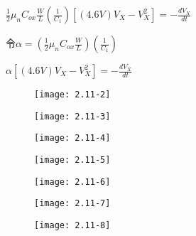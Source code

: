 $\frac{1}{2}\mu_nC_{ox}\frac{W}{L}(\frac{1}{C_1})[(4.6V)V_{X}-V_{X}^2]=-\frac{dV_X}{dt}$

令$\alpha=(\frac{1}{2}\mu_nC_{ox}\frac{W}{L})(\frac{1}{C_1})$

$\alpha[(4.6V)V_{X}-V_{X}^2]=-\frac{dV_X}{dt}$

	\begin{figure}[H] %
	\begin{minipage}{\linewidth}
		\texttt{[image: 2.11-2]}
	\end{minipage}
\end{figure}

	\begin{figure}[H] %
	\begin{minipage}{\linewidth}
		\texttt{[image: 2.11-3]}
	\end{minipage}
\end{figure}

	\begin{figure}[H] %
	\begin{minipage}{\linewidth}
		\texttt{[image: 2.11-4]}
	\end{minipage}
\end{figure}

	\begin{figure}[H] %
	\begin{minipage}{\linewidth}
		\texttt{[image: 2.11-5]}
	\end{minipage}
\end{figure}

	\begin{figure}[H] %
	\begin{minipage}{\linewidth}
		\texttt{[image: 2.11-6]}
	\end{minipage}
\end{figure}

	\begin{figure}[H] %
	\begin{minipage}{\linewidth}
		\texttt{[image: 2.11-7]}
	\end{minipage}
\end{figure}

	\begin{figure}[H] %
	\begin{minipage}{\linewidth}
		\texttt{[image: 2.11-8]}
	\end{minipage}
\end{figure}



